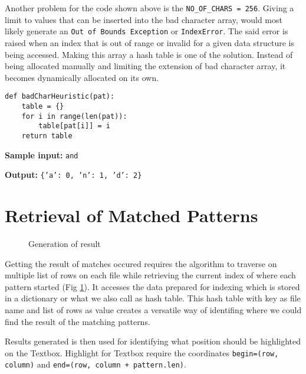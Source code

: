 \hfill

Another problem for the code shown above is the \texttt{NO\_OF\_CHARS = 256}. Giving a limit to
values that can be inserted into the bad character array, would most likely generate an \texttt{Out
of Bounds Exception} or
\texttt{IndexError}. The said error is raised when an index that is out of range or invalid for
a given data structure is being accessed. Making this array a hash table is one of the solution. Instead of being
allocated manually and limiting the extension of bad character array, it becomes dynamically allocated on its own.

\hfill

\begin{tcolorbox}[colback=white, title=\textbf{Modified Bad Character Preprocessing}]
\begin{lstlisting}[style=py]
def badCharHeuristic(pat):
    table = {}
    for i in range(len(pat)):
        table[pat[i]] = i
    return table
\end{lstlisting}

\hrulefill

\textbf{Sample input:} \texttt{and}

\textbf{Output:} \texttt{\{'a': 0, 'n': 1, 'd': 2\}}
\end{tcolorbox}

\section*{Retrieval of Matched Patterns}

\begin{figure}[hbt!]
    \center
    \noindent\adjustbox{}{}
    \caption{Generation of result}
    \label{fig:result}
\end{figure}

Getting the result of matches occured requires the algorithm to traverse on multiple list of
rows on each file while retrieving the current index of where each pattern started (Fig
\ref{fig:result}). It accesses the
data prepared for indexing which is stored in a dictionary or what we also call as hash table.
This hash table with key as file name and list of rows as value creates a versatile way of identifing
where we could find the result of the matching patterns.

\hfill

Results generated is then used for identifying what position should be highlighted on the Textbox.
Highlight for Textbox require the coordinates \texttt{begin=(row, column)} and \texttt{end=(row,
column + pattern.len)}.
